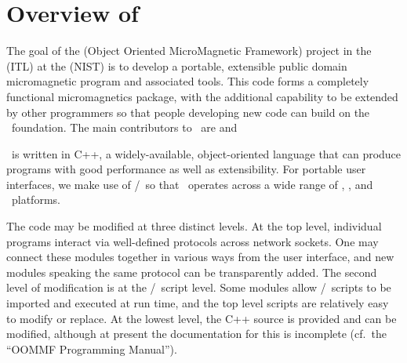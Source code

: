 \section{Overview of \OOMMF}\label{sec:overview}
The goal of the
 (Object
Oriented MicroMagnetic Framework) project in the
 (ITL) at the
 (NIST)
is to develop a portable, extensible public domain micromagnetic
program and associated tools.  This code forms a completely
functional micromagnetics package, with the additional capability to
be extended by other programmers so that people developing
new code can build on the \OOMMF\ foundation.
The main
contributors to \OOMMF\ are
and

\OOMMF\ is written in C++, a widely-available, object-oriented language
that can produce programs with good performance as well as extensibility.
For portable user interfaces, we make use of \Tcl/\Tk\ so that \OOMMF\ 
operates across a wide range of \Unix, \Windows, and \MacOSX\ platforms.

The code may be modified at three distinct levels.  At the top level,
individual programs interact via well-defined protocols across network
sockets\index{network~socket}.  One may connect these modules together
in various ways from the user interface, and new modules speaking the
same protocol can be transparently added.  The second level of
modification is at the \Tcl/\Tk\ script level.  Some modules allow
\Tcl/\Tk\ scripts to be imported and executed at run time, and the top
level scripts are relatively easy to modify or replace.  At the lowest
level, the C++ source is provided and can be modified, although at
present the documentation for this is incomplete (cf.\ the ``OOMMF
Programming Manual'').

